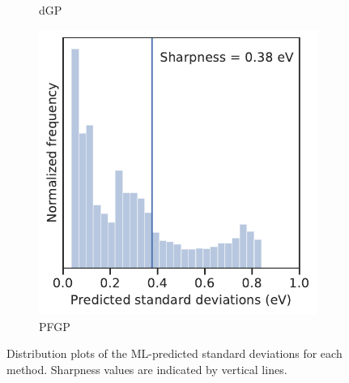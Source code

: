 \documentclass[]{achemso}
\begin{document}
\begin{figure}
\begin{subfigure}{0.32\textwidth}
        \caption{\gls{dGP}}\label{fig:sharpness_dgp}
    \end{subfigure}
    \begin{subfigure}{0.32\textwidth}
        \includegraphics[width=\textwidth]{../PFGP/Matern/sharpness.pdf}
        \caption{\gls{PFGP}}\label{fig:sharpness_pfgp}
    \end{subfigure}
    \caption{Distribution plots of the \gls{ML}-predicted standard deviations for each method.
    Sharpness values are indicated by vertical lines.}\label{fig:sharpness}
\end{figure}
\end{document}
